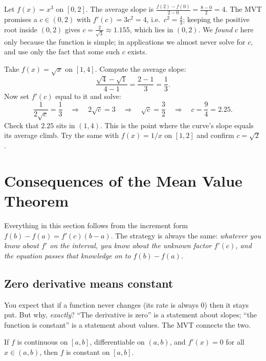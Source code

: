 \begin{example}\label{ch15:ex-find-c}
Let $f(x)=x^3$ on $[0,2]$. The average slope is
$\frac{f(2)-f(0)}{2-0}=\frac{8-0}{2}=4$. The MVT promises a $c\in(0,2)$ with
$f'(c)=3c^2=4$, i.e.\ $c^2=\frac43$; keeping the positive root inside $(0,2)$ gives
$c=\frac{2}{\sqrt3}\approx 1.155$, which lies in $(0,2)$. We
\emph{found} $c$ here only because the function is simple; in applications we
almost never solve for $c$, and use only the fact that some such $c$ exists.
\end{example}

\begin{labbox}
Take $f(x)=\sqrt{x}$ on $[1,4]$. Compute the average slope:
\[
  \frac{\sqrt4-\sqrt1}{4-1}=\frac{2-1}{3}=\frac13.
\]
Now set $f'(c)$ equal to it and solve:
\[
  \frac{1}{2\sqrt c}=\frac13
  \quad\Longrightarrow\quad 2\sqrt c=3
  \quad\Longrightarrow\quad \sqrt c=\frac32
  \quad\Longrightarrow\quad c=\frac94=2.25.
\]
Check that $2.25$ sits in $(1,4)$. This is the point where the curve's slope equals
its average climb. Try the same with $f(x)=1/x$ on $[1,2]$ and confirm $c=\sqrt2$.
\end{labbox}

\section{Consequences of the Mean Value Theorem}

Everything in this section follows from the increment form
$f(b)-f(a)=f'(c)(b-a)$. The strategy is always the same: \emph{whatever you know
about $f'$ on the interval, you know about the unknown factor $f'(c)$, and the
equation passes that knowledge on to $f(b)-f(a)$.}

\subsection{Zero derivative means constant}

You expect that if a function never changes (its rate is always $0$) then it stays
put. But why, \emph{exactly}? ``The derivative is zero'' is a statement about
slopes; ``the function is constant'' is a statement about values. The MVT
connects the two.

\begin{theorem}\label{ch15:thm-const}
If $f$ is continuous on $[a,b]$, differentiable on $(a,b)$, and $f'(x)=0$ for all
$x\in(a,b)$, then $f$ is constant on $[a,b]$.
\end{theorem}

